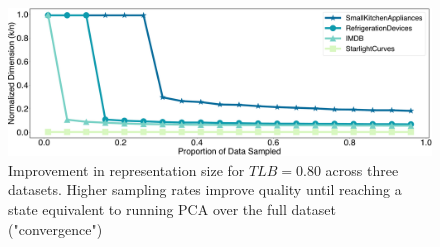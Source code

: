 \begin{figure}
\includegraphics[width=\linewidth]{figs/progressive.pdf}
\caption[]{ Improvement in representation size for  $TLB = 0.80$ across three datasets. Higher sampling rates improve quality until reaching a state equivalent to running PCA over the full dataset ("convergence")}
\label{fig:progressive}
\end{figure}



